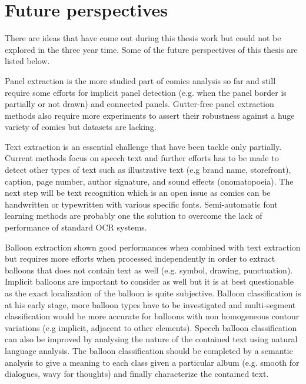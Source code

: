 \section{Future perspectives}
\label{conclusions:perspectives}

There are ideas that have come out during this thesis work but could not be explored in the three year time.
Some of the future perspectives of this thesis are listed below.

Panel extraction is the more studied part of comics analysis so far and still require some efforts for implicit panel detection (e.g. when the panel border is partially or not drawn) and connected panels.
Gutter-free panel extraction methods also require more experiments to assert their robustness against a huge variety of comics but datasets are lacking.

Text extraction is an essential challenge that have been tackle only partially.
Current methods focus on speech text and further efforts has to be made to detect other types of text such as illustrative text (e.g brand name, storefront), caption, page number, author signature, and sound effects (onomatopoeia).
The next step will be text recognition which is an open issue as comics can be handwritten or typewritten with various specific fonts.
Semi-automatic font learning methods are probably one the solution to overcome the lack of performance of standard OCR systems. 

Balloon extraction shown good performances when combined with text extraction but requires more efforts when processed independently in order to extract balloons that does not contain text as well (e.g. symbol, drawing, punctuation).
Implicit balloons are important to consider as well but it is at best questionable as the exact localization of the balloon is quite subjective.
Balloon classification is at his early stage, more balloon types have to be investigated and multi-segment classification would be more accurate for balloons with non homogeneous contour variations (e.g implicit, adjacent to other elements). 
Speech balloon classification can also be improved by analysing the nature of the contained text using natural language analysis.
The balloon classification should be completed by a semantic analysis to give a meaning to each class given a particular album (e.g. smooth for dialogues, wavy for thoughts) and finally characterize the contained text.

